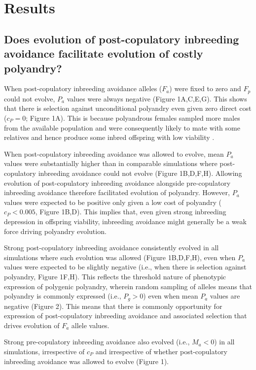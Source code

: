 \documentclass[10pt,letterpaper]{article}
\begin{document}
\section*{Results}

\subsection*{Does evolution of post-copulatory inbreeding avoidance facilitate evolution of costly polyandry?}

When post-copulatory inbreeding avoidance alleles ($F_{a}$) were fixed to zero and $F_{p}$ could not evolve, $P_{a}$ values were always negative (Figure 1A,C,E,G). This shows that there is selection against unconditional polyandry even given zero direct cost ($c_{P}=0$; Figure 1A). This is because polyandrous females sampled more males from the available population and were consequently likely to mate with some relatives and hence produce some inbred offspring with low viability \cite[][]{Duthie}. 

When post-copulatory inbreeding avoidance was allowed to evolve, mean $P_{a}$ values were substantially higher than in comparable simulations where post-copulatory inbreeding avoidance could not evolve (Figure 1B,D,F,H). Allowing evolution of post-copulatory inbreeding avoidance alongside pre-copulatory inbreeding avoidance therefore facilitated evolution of polyandry. However, $P_{a}$ values were expected to be positive only given a low cost of polyandry ($c_{P} < 0.005$, Figure 1B,D). This implies that, even given strong inbreeding depression in offspring viability, inbreeding avoidance might generally be a weak force driving polyandry evolution.

Strong post-copulatory inbreeding avoidance consistently evolved in all simulations where such evolution was allowed (Figure 1B,D,F,H), even when $P_{a}$ values were expected to be slightly negative (i.e., when there is selection against polyandry, Figure 1F,H). This reflects the threshold nature of phenotypic expression of polygenic polyandry, wherein random sampling of alleles means that polyandry is commonly expressed (i.e., $P_{g}>0$) even when mean $P_{a}$ values are negative (Figure 2). This means that there is commonly opportunity for expression of post-copulatory inbreeding avoidance and associated selection that drives evolution of $F_{a}$ allele values.

Strong pre-copulatory inbreeding avoidance also evolved (i.e., $M_{a}<0$) in all simulations, irrespective of $c_{P}$ and irrespective of whether post-copulatory inbreeding avoidance was allowed to evolve (Figure 1).
\end{document}
